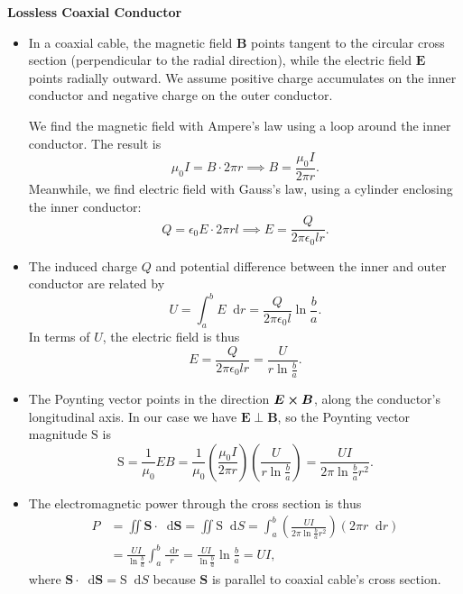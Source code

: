 \documentclass[11pt, a4paper]{article}
\newcommand{\diff}{\mathop{}\!\mathrm{d}} %
\renewcommand{\vec}[1]{\bm{#1}} %
\newcommand{\E}{\vec{E}}  %
\newcommand{\B}{\vec{B}}  %
\renewcommand{\S}{\mathbf{S}}  %
\renewcommand{\SS}{\mathrm{S}}  %
\newcommand{\ee}{\epsilon_{0}}  %
\newcommand{\mm}{\mu_{0}}  %
\newcommand{\m}{\vec{m}}  %
\newcommand{\Poy}{Poynting\xspace}
\begin{document}
\textbf{Lossless Coaxial Conductor}
\begin{itemize}
	\item In a coaxial cable, the magnetic field $ \B $ points tangent to the circular cross section (perpendicular to the radial direction), while the electric field $ \E $ points radially outward. We assume positive charge accumulates on the inner conductor and negative charge on the outer conductor.
	
	We find the magnetic field with Ampere's law using a loop around the inner conductor. The result is
	\begin{equation*}
		\mm I = B \cdot 2\pi r \implies B = \frac{\mm I}{2\pi r}.
	\end{equation*}
	Meanwhile, we find electric field with Gauss's law, using a cylinder enclosing the inner conductor:
	\begin{equation*}
		Q = \ee E \cdot 2\pi r l \implies E = \frac{Q}{2\pi \ee l r}.
	\end{equation*}
	
	
	\item The induced charge $ Q $ and potential difference between the inner and outer conductor are related by
	\begin{equation*}
		U = \int_{a}^{b} E \diff r = \frac{Q}{2\pi \ee l}\ln \frac{b}{a}.
	\end{equation*}
	In terms of $ U $, the electric field is thus
	\begin{equation*}
		E = \frac{Q}{2\pi \ee l r} = \frac{U}{r \ln \frac{b}{a}}.
	\end{equation*}
	
	\item The \Poy vector points in the direction $ \E \cross \B $, along the conductor's longitudinal axis. In our case we have $ \E \perp \B $, so the \Poy vector magnitude $ \SS $ is
	\begin{equation*}
		\SS = \frac{1}{\mm}EB = \frac{1}{\mm} \left (\frac{\mm I}{2\pi r}\right )\left(\frac{U}{r \ln \frac{b}{a}}\right) = \frac{UI}{2 \pi \ln \frac{b}{a}r^{2}}.
	\end{equation*}
	
	\item The electromagnetic power through the cross section is thus
	\begin{align*}
		P &= \iint \S \cdot \diff \vec{S} = \iint \SS \diff S = \int_{a}^{b}\left(\frac{UI}{2 \pi \ln \frac{b}{a}r^{2}}\right)(2\pi r \diff r)\\
		& = \frac{UI}{\ln \frac{b}{a}} \int_{a}^{b} \frac{\diff r}{r} =	\frac{UI}{\ln \frac{b}{a}}\ln \frac{b}{a} = UI,
	\end{align*}
	where $ \S \cdot \diff \vec{S} = \SS \diff S $ because $ \S $ is parallel to coaxial cable's cross section.
	
\end{itemize}
\end{document}
